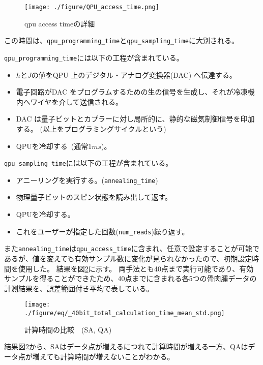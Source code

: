 \documentclass[12pt, dvipdfmx]{jmaster}
\theoremstyle{definition}
\begin{document}
\begin{figure}[H]
	\begin{center}
		\texttt{[image: ./figure/QPU\_access\_time.png]}
	\end{center}
	\caption{qpu access timeの詳細}
	\label{fig:qpu_access_time}
\end{figure}

この時間は、\verb*|qpu_programming_time|と\verb*|qpu_sampling_time|に大別される。

\verb*|qpu_programming_time|には以下の工程が含まれている。
\begin{itemize}
	\item $h$と$J$の値をQPU 上のデジタル・アナログ変換器(DAC) へ伝達する。
	\item 電子回路がDAC をプログラムするための生の信号を生成し、それが冷凍機内へワイヤを介して送信される。
	\item DAC は量子ビットとカプラーに対し局所的に、静的な磁気制御信号を印加する。 (以上をプログラミングサイクルという)
	\item QPUを冷却する (通常$1ms$)。
\end{itemize}

\verb*|qpu_sampling_time|には以下の工程が含まれている。
\begin{itemize}
	\item アニーリングを実行する。(\verb*|annealing_time|)
	\item 物理量子ビットのスピン状態を読み出して返す。
	\item QPUを冷却する。
	\item これをユーザーが指定した回数(\verb*|num_reads|)繰り返す。
\end{itemize}

また\verb*|annealing_time|は\verb*|qpu_access_time|に含まれ、任意で設定することが可能であるが、値を変えても有効サンプル数に変化が見られなかったので、初期設定時間を使用した。
結果を図\ref{fig:SA_QA_total_time}に示す。
両手法とも40点まで実行可能であり、有効サンプルを得ることができたため、40点までに含まれる各5つの骨肉腫データの計測結果を、誤差範囲付き平均で表している。

\begin{figure}[H]
	\begin{center}
		\texttt{[image: ./figure/eq/\_40bit\_total\_calculation\_time\_mean\_std.png]}
	\end{center}
	\caption{計算時間の比較　(SA, QA)}
	\label{fig:SA_QA_total_time}
\end{figure}

結果図\ref{fig:SA_QA_total_time}から、SAはデータ点が増えるにつれて計算時間が増える一方、QAはデータ点が増えても計算時間が増えないことがわかる。
\end{document}

